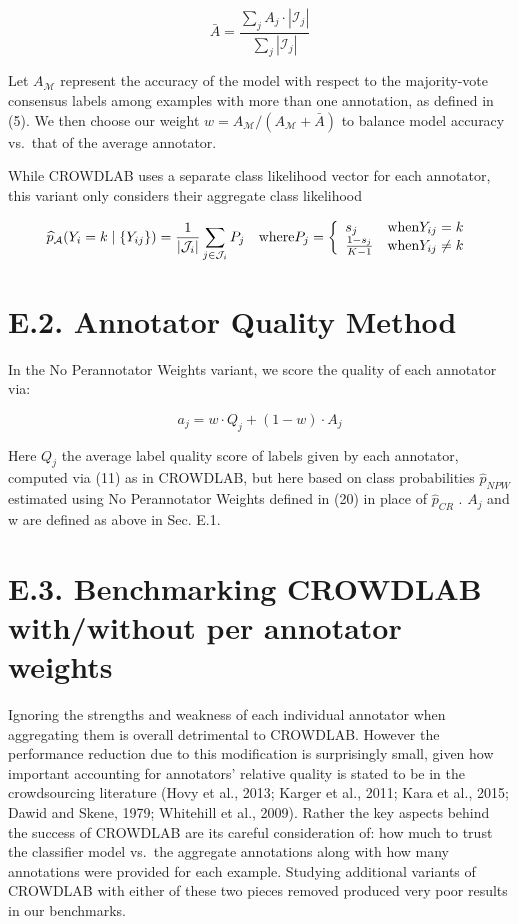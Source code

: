 \documentclass[
]{article}
\begin{document}
\[
\bar {A} = \frac {\sum_ {j} A _ {j} \cdot | \mathcal {I} _ {j} |}{\sum_ {j} | \mathcal {I} _ {j} |}
\]

Let \(A_{\mathcal{M}}\) represent the accuracy of the model with respect
to the majority-vote consensus labels among examples with more than one
annotation, as defined in (5). We then choose our weight
\(w = A_{\mathcal{M}} / (A_{\mathcal{M}} + \bar{A})\) to balance model
accuracy vs.~that of the average annotator.

While CROWDLAB uses a separate class likelihood vector for each
annotator, this variant only considers their aggregate class likelihood

\[
\widehat {p} _ {\mathcal {A}} (Y _ {i} = k \mid \{Y _ {i j} \}) = \frac {1}{| \mathcal {J} _ {i} |} \sum_ {j \in \mathcal {J} _ {i}} P _ {j} \quad \text {where} P _ {j} = \left\{ \begin{array}{l l} s _ {j} & \text {when} Y _ {i j} = k \\ \frac {1 - s _ {j}}{K - 1} & \text {when} Y _ {i j} \neq k \end{array} \right.
\]

\section{E.2. Annotator Quality
Method}\label{e.2.-annotator-quality-method}

In the No Perannotator Weights variant, we score the quality of each
annotator via:

\[
a _ {j} = w \cdot Q _ {j} + (1 - w) \cdot A _ {j}
\]

Here \(Q_{j}\) the average label quality score of labels given by each
annotator, computed via (11) as in CROWDLAB, but here based on class
probabilities \(\widehat{p}_{NPW}\) estimated using No Perannotator
Weights defined in (20) in place of \(\widehat{p}_{CR}\) . \(A_{j}\) and
w are defined as above in Sec. E.1.

\section{E.3. Benchmarking CROWDLAB with/without per annotator
weights}\label{e.3.-benchmarking-crowdlab-withwithout-per-annotator-weights}

Ignoring the strengths and weakness of each individual annotator when
aggregating them is overall detrimental to CROWDLAB. However the
performance reduction due to this modification is surprisingly small,
given how important accounting for annotators' relative quality is
stated to be in the crowdsourcing literature (Hovy et al., 2013; Karger
et al., 2011; Kara et al., 2015; Dawid and Skene, 1979; Whitehill et
al., 2009). Rather the key aspects behind the success of CROWDLAB are
its careful consideration of: how much to trust the classifier model
vs.~the aggregate annotations along with how many annotations were
provided for each example. Studying additional variants of CROWDLAB with
either of these two pieces removed produced very poor results in our
benchmarks.
\end{document}
